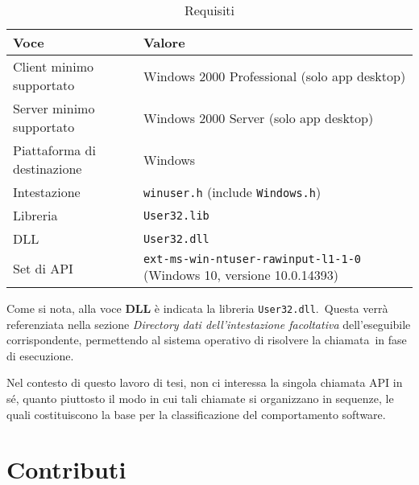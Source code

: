 \begin{table}[ht]
      \centering
      \caption{Requisiti}
      \label{tab:GetKeyboardState-Requisiti}
      \begin{tabular}{ll}
            \toprule
            \textbf{Voce}               & \textbf{Valore}                                                              \\
            \midrule
            Client minimo supportato    & Windows 2000 Professional (solo app desktop)                                 \\
            Server minimo supportato    & Windows 2000 Server (solo app desktop)                                       \\
            Piattaforma di destinazione & Windows                                                                      \\
            Intestazione                & \texttt{winuser.h} (include \texttt{Windows.h})                              \\
            Libreria                    & \texttt{User32.lib}                                                          \\
            DLL                         & \texttt{User32.dll}                                                          \\
            Set di API                  & \texttt{ext-ms-win-ntuser-rawinput-l1-1-0} (Windows 10, versione 10.0.14393) \\
            \bottomrule
      \end{tabular}
\end{table}

Come si nota, alla voce \textbf{DLL} è indicata la libreria \texttt{User32.dll}.\
Questa verrà referenziata nella sezione \textit{Directory dati dell’intestazione facoltativa} dell’eseguibile corrispondente, permettendo al sistema operativo di risolvere la chiamata\
in fase di esecuzione.

Nel contesto di questo lavoro di tesi, non ci interessa la singola chiamata API in sé, quanto piuttosto il modo in cui tali chiamate si organizzano in sequenze,
le quali costituiscono la base per la classificazione del comportamento software.

\section{Contributi}

